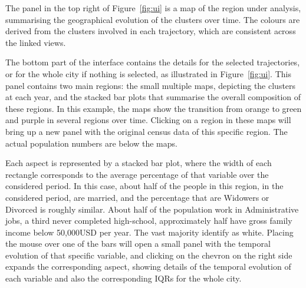The panel in the top right of Figure~\ref{fig:ui} is a map of the region under
analysis, summarising the geographical evolution of the clusters over time.  The
colours are derived from the clusters involved in each trajectory, which are
consistent across the linked views. 

The bottom part of the interface contains the details for the selected
trajectories, or for the whole city if nothing is selected, as illustrated in
Figure~\ref{fig:ui}. This panel contains two main regions: the small multiple
maps, depicting the clusters at each year, and the stacked bar plots that
summarise the overall composition of these regions. In this example, the maps
show the transition from orange to green and purple in several regions over
time. Clicking on a region in these maps will bring up a new panel with the
original census data of this specific region. The actual population numbers are
below the maps.

Each aspect is represented by a stacked bar plot, where the width of each
rectangle corresponds to the average percentage of that variable over the
considered period. In this case, about half of the people in this region, in the
considered period, are married, and the percentage that are Widowers or Divorced
is roughly similar. About half of the population work in Administrative jobs, a
third never completed high-school, approximately half have gross family income
below 50,000USD per year. The vast majority identify as white. Placing the mouse
over one of the bars will open a small panel with the temporal evolution of that
specific variable, and clicking on the chevron on the right side expands the
corresponding aspect, showing details of the temporal evolution of each variable
and also the corresponding IQRs for the whole city.